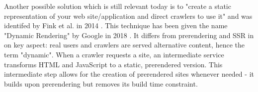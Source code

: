 Another possible solution which is still relevant today is to "create a static representation of your web site/application and direct crawlers to use it" and was identifed by Fink et al. in 2014 \cite[p.~270]{Fink2014:inbook}. This technique has been given the name "Dynamic Rendering" by Google in 2018 \cite{DynamicRenderingGoogle:online}. It differs from prerendering and SSR in on key aspect: real users and crawlers are served alternative content, hence the term "dynamic". When a crawler requests a site, an intermediate service transforms HTML and JavaScript to a static, prerendered version. This intermediate step allows for the creation of prerendered sites whenever needed - it builds upon prerendering but removes its build time constraint.



